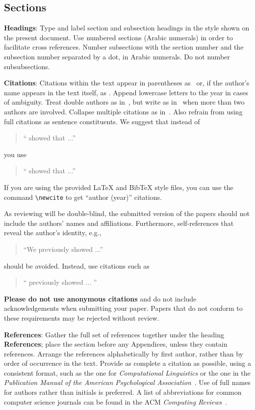 \documentclass[11pt]{article}
\begin{document}
\subsection{Sections}

{\bf Headings}: Type and label section and subsection headings in the
style shown on the present document.  Use numbered sections (Arabic
numerals) in order to facilitate cross references. Number subsections
with the section number and the subsection number separated by a dot,
in Arabic numerals. Do not number subsubsections.

{\bf Citations}: Citations within the text appear
in parentheses as~\cite{vaswani2017attention} or, if the author's name appears in
the text itself, as . 
Append lowercase letters to the year in cases of ambiguity.  
Treat double authors as in~\cite{Aho:72}, but write as
 in~\cite{Chandra:81} when more than two authors are involved. Collapse multiple citations as
in~\cite{Gusfield:97,Aho:72}. Also refrain from using full citations as sentence constituents. We
suggest that instead of
\begin{quote}
  ``\cite{vaswani2017attention} showed that ...''
\end{quote}
you use
\begin{quote}
`` showed that ...''
\end{quote}

If you are using the provided \LaTeX{} and Bib\TeX{} style files, you
can use the command \verb|\newcite| to get ``author (year)'' citations.

As reviewing will be double-blind, the submitted version of the papers should not include the
authors' names and affiliations. Furthermore, self-references that
reveal the author's identity, e.g.,
\begin{quote}
``We previously showed \cite{vaswani2017attention} ...''  
\end{quote}
should be avoided. Instead, use citations such as 
\begin{quote}
``
previously showed ... ''
\end{quote}

\textbf{Please do not  use anonymous citations} and  do not include acknowledgements 
when submitting your paper. Papers that do not conform
to these requirements may be rejected without review. 

\textbf{References}: Gather the full set of references together under
the heading {\bf References}; place the section before any Appendices,
unless they contain references. Arrange the references alphabetically
by first author, rather than by order of occurrence in the text.
Provide as complete a citation as possible, using a consistent format,
such as the one for {\em Computational Linguistics\/} or the one in the 
{\em Publication Manual of the American 
Psychological Association\/}~\cite{APA:83}.  Use of full names for
authors rather than initials is preferred.  A list of abbreviations
for common computer science journals can be found in the ACM 
{\em Computing Reviews\/}~\cite{ACM:83}.
\end{document}
